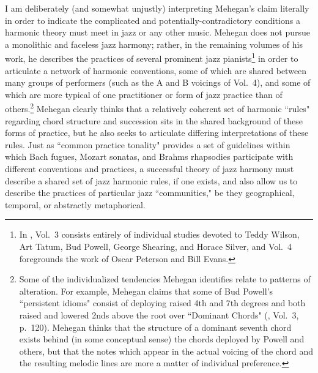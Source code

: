 I am deliberately (and somewhat unjustly) interpreting Mehegan's claim literally in order to indicate the complicated and potentially-contradictory conditions a harmonic theory must meet in jazz or any other music.  Mehegan does not pursue a monolithic and faceless jazz harmony; rather, in the remaining volumes of his work, he describes the practices of several prominent jazz pianists\footnote{In \cite{mehegan1959}, Vol.\ 3 consists entirely of individual studies devoted to Teddy Wilson, Art Tatum, Bud Powell, George Shearing, and Horace Silver, and Vol.\ 4 foregrounds the work of Oscar Peterson and Bill Evans.} in order to articulate a network of harmonic conventions, some of which are shared between many groups of performers (such as the A and B voicings of Vol.\ 4), and some of which are more typical of one practitioner or form of jazz practice than of others.\footnote{Some of the individualized tendencies Mehegan identifies relate to patterns of alteration.  For example, Mehegan claims that some of Bud Powell's ``persistent idioms" consist of deploying raised 4th and 7th degrees and both raised and lowered 2nds above the root over ``Dominant Chords" (\cite{mehegan1959}, Vol.\ 3, p.\ 120).  Mehegan thinks that the structure of a dominant seventh chord exists behind (in some conceptual sense) the chords deployed by Powell and others, but that the notes which appear in the actual voicing of the chord and the resulting melodic lines are more a matter of individual preference.}  Mehegan clearly thinks that a relatively coherent set of harmonic ``rules" regarding chord structure and succession sits in the shared background of these forms of practice, but he also seeks to articulate differing interpretations of these rules.  Just as ``common practice tonality" provides a set of guidelines within which Bach fugues, Mozart sonatas, and Brahms rhapsodies participate with different conventions and practices, a successful theory of jazz harmony must describe a shared set of jazz harmonic rules, if one exists, and also allow us to describe the practices of particular jazz ``communities," be they geographical, temporal, or abstractly metaphorical.

